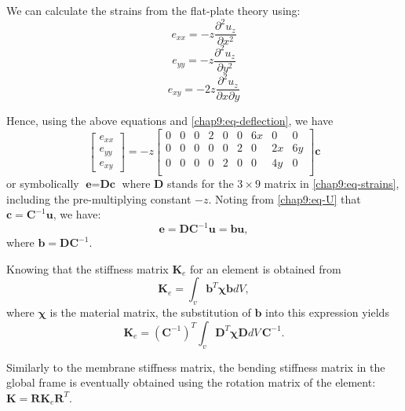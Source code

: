 \noindent We can calculate the strains from the flat-plate theory using:
\begin{equation}
e_{xx} = -z \frac{\partial^2u_z}{\partial x^2}
\end{equation} 
\begin{equation}
e_{yy} = -z \frac{\partial^2u_z}{\partial y^2}
\end{equation} 
\begin{equation}
e_{xy} = -2z \frac{\partial^2u_z}{\partial x \partial y}
\end{equation} 

\noindent Hence, using the above equations and \eqref{chap9:eq-deflection}, we have
\begin{equation}
\begin{bmatrix}
e_{xx} \\
e_{yy} \\
e_{xy}
\end{bmatrix}
= 
-z
\begin{bmatrix}
0 & 0 & 0 & 2 & 0 & 0 & 6x & 0 & 0 \\
0 & 0 & 0 & 0 & 0 & 2 & 0 & 2x & 6y \\
0 & 0 & 0 & 0 & 2 & 0 & 0 & 4y & 0 \\
\end{bmatrix}
\textbf{c}
\label{chap9:eq-strains}
\end{equation} 
or symbolically $\textbf{e} = \textbf{Dc}$ where $\textbf{D}$ stands for the $3\times 9$ matrix in \eqref{chap9:eq-strains}, including the pre-multiplying constant $-z$. Noting from \eqref{chap9:eq-U} that $\textbf{c} = \textbf{C}^{-1}\textbf{u}$, we have:
\begin{equation}
\textbf{e} = \textbf{DC}^{-1}\textbf{u} = \textbf{bu},
\end{equation} 
where $\textbf{b} = \textbf{DC}^{-1}$. 

\noindent Knowing that the stiffness matrix $\textbf{K}_e$ for an element is obtained from
\begin{equation}
\textbf{K}_e = \int_v \textbf{b}^{T} \boldsymbol\chi \textbf{b} dV,
\end{equation} 
where $\boldsymbol\chi$ is the material matrix, the substitution of $\textbf{b}$ into this expression yields
\begin{equation}
\label{chap9:Ke}
\textbf{K}_e = (\textbf{C}^{-1})^T \int_v \textbf{D}^{T} \boldsymbol\chi \textbf{D} dV \, \textbf{C}^{-1}.
\end{equation} 

Similarly to the membrane stiffness matrix, the bending stiffness matrix in the global frame is eventually obtained using the rotation matrix of the element: $\textbf{K} = \textbf{R} \textbf{K}_e \textbf{R}^{T}$.


